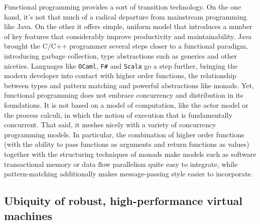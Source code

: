 Functional programming provides a sort of transition technology. On
the one hand, it's not that much of a radical departure from
mainstream programming like Java. On the other it offers simple,
uniform model that introduces a number of key features that
considerably improve productivity and maintainability. Java brought
the C/C++ programmer several steps closer to a functional paradigm,
introducing garbage collection, type abstractions such as generics and
other niceties. Languages like \texttt{OCaml}, \texttt{F\#} and
\texttt{Scala} go a step further, bringing the modern developer into
contact with higher order functions, the relationship between types
and pattern matching and powerful abstractions like monads. Yet,
functional programming does not embrace concurrency and distribution
in its foundations. It is not based on a model of computation, like
the actor model or the process calculi, in which the notion of
execution that is fundamentally concurrent. That said, it meshes
nicely with a variety of concurrency programming models. In
particular, the combination of higher order functions (with the
ability to pass functions as arguments and return functions as values)
together with the structuring techniques of monads make models such as
software transactional memory or data flow parallelism quite easy to
integrate, while pattern-matching additionally makes message-passing
style easier to incorporate.

\subsection{Ubiquity of robust, high-performance virtual machines}

